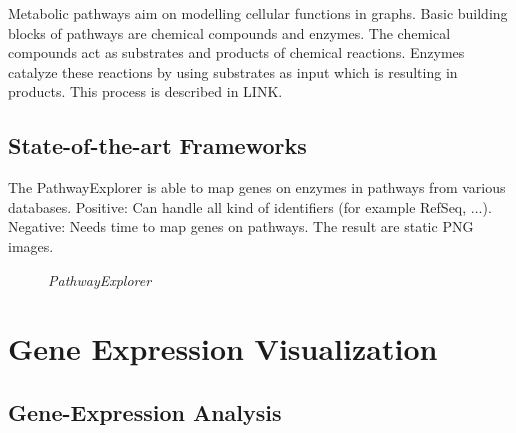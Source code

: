 Metabolic pathways aim on modelling cellular functions in graphs. Basic building blocks of pathways are chemical compounds and enzymes. The chemical compounds act as substrates and products of chemical reactions. Enzymes catalyze these reactions by using substrates as input which is resulting in products. This process is described in LINK.

\subsection{State-of-the-art Frameworks}


The PathwayExplorer is able to map genes on enzymes in pathways from various databases.
Positive: Can handle all kind of identifiers (for example RefSeq, ...).
Negative: Needs time to map genes on pathways. The result are static PNG images.

\begin{figure}[ht]
\centering
{} 
\caption[PathwayExplorer]{\textit{PathwayExplorer}} 
\label{gfx:pathway_explorer}
\end{figure}

\section{Gene Expression Visualization}

\subsection{Gene-Expression Analysis}

